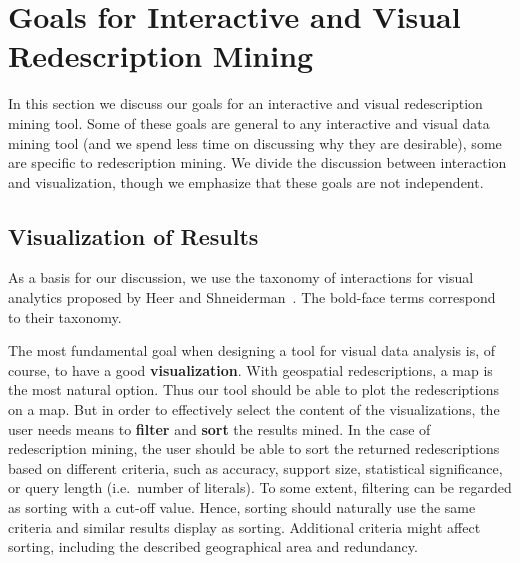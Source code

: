 
\section{Goals for Interactive and Visual Redescription Mining}
\label{sec:goals-inter-visu}

In this section we discuss our goals for an interactive and visual
redescription mining tool. Some of these goals are general to any
interactive and visual data mining tool (and we spend less time on
discussing why they are desirable), some are specific to
redescription mining. We divide the discussion between interaction and
visualization, though we emphasize that these goals are not independent.


\subsection{Visualization of Results}
\label{sec:goals-visualization}
As a basis for our discussion, we use the taxonomy of interactions for
visual analytics proposed by Heer and
Shneiderman~\cite{Heer:2012:IDV:2133806.2133821}. The bold-face terms
correspond to their taxonomy.

 The most fundamental goal when designing a
tool for visual data analysis is, of course, to have a good
\textbf{visualization}. With geospatial redescriptions, a map is the
most natural option. Thus our tool should be able to plot the
redescriptions on a map. But in order to effectively select the
content of the visualizations, the user needs means to \textbf{filter}
and \textbf{sort} the results mined. In the case of redescription
mining, the user should be able to sort the returned redescriptions
based on different criteria, such as accuracy, support size,
statistical significance, or query length (i.e.\ number of literals).
To some extent, filtering can be regarded as sorting with a cut-off
value. Hence, sorting should naturally use the same criteria and
similar results display as sorting. Additional criteria might affect
sorting, including the described geographical area and redundancy.

